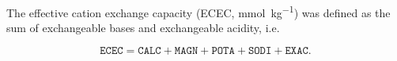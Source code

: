 
The effective cation exchange capacity (ECEC, \si{\milli\mole\per\kilo\gram}) was defined as the sum of 
exchangeable bases and exchangeable acidity, i.e. 

\begin{equation*}
 \texttt{ECEC} = \texttt{CALC} + \texttt{MAGN} + \texttt{POTA} + \texttt{SODI} + \texttt{EXAC}.
\end{equation*}



